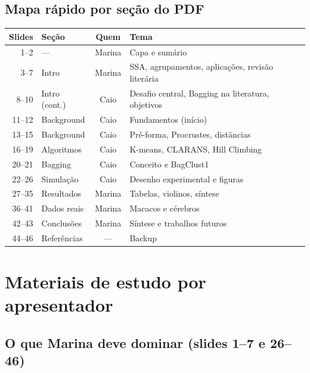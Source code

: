 \documentclass[12pt,a4paper]{article}
\begin{document}
\subsection{Mapa rápido por seção do PDF}

\begin{table}[h]
\centering
\small
\begin{tabular}{@{}rlcl@{}}
\toprule
\textbf{Slides} & \textbf{Seção} & \textbf{Quem} & \textbf{Tema} \\
\midrule
1--2 & --- & Marina & Capa e sumário \\
3--7 & Intro & Marina & SSA, agrupamentos, aplicações, revisão literária \\
8--10 & Intro (cont.) & Caio & Desafio central, Bagging na literatura, objetivos \\
11--12 & Background & Caio & Fundamentos (início) \\
13--15 & Background & Caio & Pré-forma, Procrustes, distâncias \\
16--19 & Algoritmos & Caio & K-means, CLARANS, Hill Climbing \\
20--21 & Bagging & Caio & Conceito e BagClust1 \\
22--26 & Simulação & Caio & Desenho experimental e figuras \\
27--35 & Resultados & Marina & Tabelas, violinos, síntese \\
36--41 & Dados reais & Marina & Macacos e cérebros \\
42--43 & Conclusões & Marina & Síntese e trabalhos futuros \\
44--46 & Referências & --- & Backup \\
\bottomrule
\end{tabular}
\end{table}

\section{Materiais de estudo por apresentador}

\subsection{O que Marina deve dominar (slides 1--7 e 26--46)}
\end{document}
